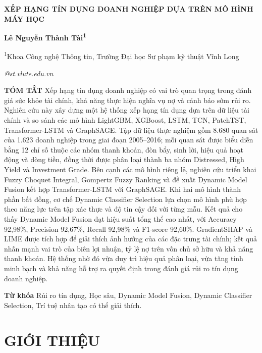 \documentclass[10pt,twoside]{article}
\makeatletter
\newcommand{\arialfont}{\fontfamily{phv}\selectfont}
\newcommand{\PaperTitle}{XẾP HẠNG TÍN DỤNG DOANH NGHIỆP DỰA TRÊN MÔ HÌNH MÁY HỌC}
\newcommand{\PaperAuthors}{Lê Nguyễn Thành Tài\textsuperscript{1}}
\newcommand{\PaperAffiliations}{%
\textsuperscript{1}Khoa Công nghệ Thông tin, Trường Đại học Sư phạm kỹ thuật Vĩnh Long
}
\newcommand{\PaperEmail}{22022001@st.vlute.edu.vn}
\newcommand{\makefairtitle}{%
\thispagestyle{firstpage}%
\begin{center}
{\arialfont\bfseries\fontsize{14pt}{16pt}\selectfont\MakeUppercase{\PaperTitle}\par}
\vspace{3pt}
{\bfseries\normalsize\PaperAuthors\par}
\vspace{3pt}
{\fontsize{9pt}{11pt}\selectfont\PaperAffiliations\par}
\vspace{3pt}
{\itshape\fontsize{9pt}{11pt}\selectfont\PaperEmail\par}
\end{center}
\vspace{6pt}%
}
\newcommand{\FairDash}{\unskip\textemdash\space}
\newenvironment{fairabstract}{%
\begingroup
\fontsize{9pt}{11pt}\selectfont
\itshape
\setlength{\parindent}{1cm}%
\setlength{\parskip}{6pt}%
}{%
\par\endgroup
}
\newcommand{\fairabstracttext}[1]{%
\begin{fairabstract}
\textbf{TÓM TẮT}\FairDash #1
\end{fairabstract}
}
\newcommand{\fairkeywords}[1]{%
\begin{fairabstract}
\textbf{Từ khóa}\FairDash #1
\end{fairabstract}
}
\makeatother
\begin{document}
\makefairtitle

\fairabstracttext{%
Xếp hạng tín dụng doanh nghiệp có vai trò quan trọng trong đánh giá sức khỏe tài chính, khả năng thực hiện nghĩa vụ nợ và cảnh báo sớm rủi ro. Nghiên cứu này xây dựng một hệ thống xếp hạng tín dụng dựa trên dữ liệu tài chính và so sánh các mô hình LightGBM, XGBoost, LSTM, TCN, PatchTST, Transformer-LSTM và GraphSAGE. Tập dữ liệu thực nghiệm gồm 8.680 quan sát của 1.623 doanh nghiệp trong giai đoạn 2005--2016; mỗi quan sát được biểu diễn bằng 12 chỉ số thuộc các nhóm thanh khoản, đòn bẩy, sinh lời, hiệu quả hoạt động và dòng tiền, đồng thời được phân loại thành ba nhóm Distressed, High Yield và Investment Grade. Bên cạnh các mô hình riêng lẻ, nghiên cứu triển khai Fuzzy Choquet Integral, Gompertz Fuzzy Ranking và đề xuất Dynamic Model Fusion kết hợp Transformer-LSTM với GraphSAGE. Khi hai mô hình thành phần bất đồng, cơ chế Dynamic Classifier Selection lựa chọn mô hình phù hợp theo năng lực trên tập xác thực và độ tin cậy đối với từng mẫu. Kết quả cho thấy Dynamic Model Fusion đạt hiệu suất tổng thể cao nhất, với Accuracy 92,98\%, Precision 92,67\%, Recall 92,98\% và F1-score 92,60\%. GradientSHAP và LIME được tích hợp để giải thích ảnh hưởng của các đặc trưng tài chính; kết quả nhấn mạnh vai trò của biên lợi nhuận, tỷ lệ nợ trên vốn chủ sở hữu và khả năng thanh khoản. Hệ thống nhờ đó vừa duy trì hiệu quả phân loại, vừa tăng tính minh bạch và khả năng hỗ trợ ra quyết định trong đánh giá rủi ro tín dụng doanh nghiệp.
}

\fairkeywords{%
Rủi ro tín dụng, Học sâu, Dynamic Model Fusion, Dynamic Classifier Selection, Trí tuệ nhân tạo có thể giải thích.
}

\section{GIỚI THIỆU}
\end{document}
